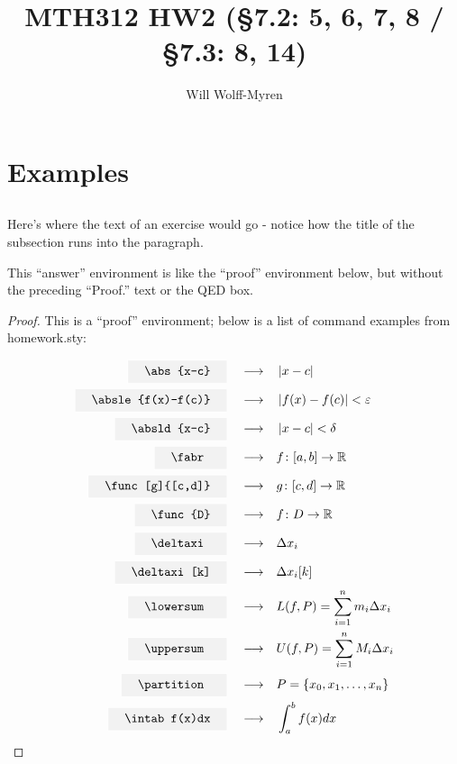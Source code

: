 \documentclass{article}
\title{MTH312 HW2 (\S7.2: 5, 6, 7, 8 /  \S7.3: 8, 14) }
\author{Will Wolff-Myren}
\begin{document}
\section{Examples}

\subsection{}
Here's where the text of an exercise would go - notice how the title of the subsection runs into the paragraph.

    
    \begin{answer}
        This ``answer'' environment is like the ``proof'' environment below, 
        but without the preceding ``Proof.'' text or the QED box.
    \end{answer}

    \begin{proof}
    
        This is a ``proof'' environment; below is a list of command examples from homework.sty:
    
        \begin{align*}
            \cop{\abs{x-c}} \\
            \cop{\absle{f(x)-f(c)}} \\
            \cop{\absld{x-c}} \\
            \cop{\fabr} \\
            \cop{\func[g]{[c,d]}} \\
            \cop{\func{D}} \\
            \cop{\deltaxi} \\
            \cop{\deltaxi[k]} \\
            \cop{\lowersum} \\
            \cop{\uppersum} \\
            \cop{\partition} \\
            \cop{\intab f(x)dx}
        \end{align*}
    
    \end{proof}
\end{document}
